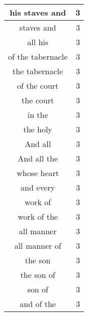 \begin{center}
\begin{longtable}{|c|c|}
his staves and & 3\\ \hline 
staves and & 3\\ \hline 
all his & 3\\ \hline 
of the tabernacle & 3\\ \hline 
the tabernacle & 3\\ \hline 
of the court & 3\\ \hline 
the court & 3\\ \hline 
in the & 3\\ \hline 
the holy & 3\\ \hline 
And all & 3\\ \hline 
And all the & 3\\ \hline 
whose heart & 3\\ \hline 
and every & 3\\ \hline 
work of & 3\\ \hline 
work of the & 3\\ \hline 
all manner & 3\\ \hline 
all manner of & 3\\ \hline 
the son & 3\\ \hline 
the son of & 3\\ \hline 
son of & 3\\ \hline 
and of the & 3\\ \hline 
\end{longtable}
\end{center}





